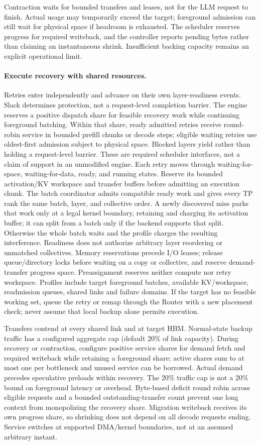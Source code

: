 Contraction waits for bounded transfers and leases, not for the LLM
request to finish. Actual usage may temporarily exceed the target;
foreground admission can still wait for physical space if headroom is
exhausted. The scheduler reserves progress for required writeback, and
the controller reports pending bytes rather than claiming an instantaneous
shrink. Insufficient backing capacity remains an explicit operational limit.
\paragraph{Execute recovery with shared resources.}
Retries enter independently and advance on their own layer-readiness
events. Slack determines protection, not a request-level completion
barrier. The engine reserves a positive dispatch share for feasible recovery
work while continuing foreground batching. Within that share, ready admitted
retries receive round-robin service in bounded prefill chunks or decode steps;
eligible waiting retries use oldest-first admission subject to physical space.
Blocked layers yield rather than holding a request-level barrier. These are
required scheduler interfaces, not a claim of support in an unmodified engine.
Each retry moves through waiting-for-space, waiting-for-data, ready, and
running states. Reserve its bounded activation/KV workspace and transfer
buffers before admitting an execution chunk. The batch coordinator admits
compatible ready work and gives every TP rank the same batch, layer, and
collective order. A newly discovered miss parks that work only at a legal
kernel boundary, retaining and charging its activation buffer; it can split
from a batch only if the backend supports that split. Otherwise the whole
batch waits and the profile charges the resulting interference. Readiness
does not authorize arbitrary layer reordering or unmatched collectives.
Memory reservations precede I/O leases; release queue/directory locks before
waiting on a copy or collective, and reserve demand-transfer progress space.
Preassignment reserves neither compute nor retry workspace. Profiles
include target foreground batches, available KV/workspace, readmission
queues, shared links and failure domains. If the target has no feasible
working set, queue the retry or remap through the Router with a new
placement check; never assume that local backup alone permits execution.

Transfers contend at every shared link and at target HBM. Normal-state
backup traffic has a configured aggregate cap (default 20\% of link
capacity). During recovery or contraction, configure positive service
shares for demand fetch and required writeback while retaining a foreground
share; active shares sum to at most one per bottleneck and unused service
can be borrowed. Actual demand precedes speculative preloads within recovery.
The 20\% traffic cap is not a 20\% bound on foreground latency or overhead.
Byte-based deficit round robin across eligible requests and a bounded
outstanding-transfer count prevent one long context from monopolizing
the recovery share. Migration writeback receives its own progress share,
so shrinking does not depend on all decode requests ending. Service switches
at supported DMA/kernel boundaries, not at an assumed arbitrary instant.

